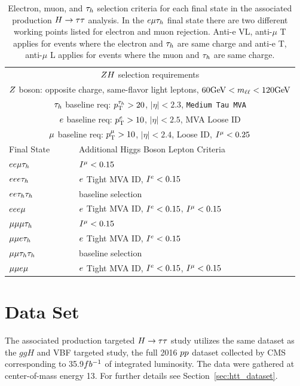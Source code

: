 \begin{table}[htbp]
\begin{small}
\begin{tabular}{ll}
\\
     \multicolumn{2}{c}{$ZH$ selection requirements}                 \\ 
     \multicolumn{2}{c}{$Z$ boson: opposite charge, same-flavor light leptons, $60\mathrm{GeV} < m_{\ell\ell} < 120\mathrm{GeV}$}  \\ 
     \multicolumn{2}{c}{$\tau_{h}$ baseline req: $p_\mathrm{T}^{\tau_{h}}>20$, $|\eta|<2.3$, \texttt{Medium Tau MVA}}   \\ 
     \multicolumn{2}{c}{$e$ baseline req: $p_\mathrm{T}^{e}>10$, $|\eta|<2.5$, MVA Loose ID }   \\ 
     \multicolumn{2}{c}{$\mu$ baseline req: $p_\mathrm{T}^{\mu}>10$, $|\eta|<2.4$, Loose ID, $I^{\mu}<0.25$ }   \\ 
\hline
  Final State           &        Additional Higgs Boson Lepton Criteria  \\
\hline
  $ee\mu\tau_{h}$     &   $I^{\mu}<0.15$       \\
  $eee\tau_{h}$      &   $e$ Tight MVA ID, $I^{e}<0.15$ \\
  $ee\tau_{h}\tau_{h}$    &   baseline selection       \\
  $eee\mu$       &   $e$ Tight MVA ID, $I^{e}<0.15$, $I^{\mu}<0.15$ \\
\hline
  $\mu\mu\mu\tau_{h}$   &   $I^{\mu}<0.15$       \\
  $\mu\mu e\tau_{h}$    &   $e$ Tight MVA ID, $I^{e}<0.15$ \\
  $\mu\mu\tau_{h}\tau_{h}$  &   baseline selection       \\
  $\mu\mu e\mu$     &   $e$ Tight MVA ID, $I^{e}<0.15$, $I^{\mu}<0.15$ \\
\hline
\end{tabular}
\end{small}
\caption{
Electron, muon, and $\tau_{h}$ selection criteria for each final state in the
associated production $H\to\tau\tau$ analysis. In the $e\mu\tau_{h}$ final state there
are two different working points listed for electron and muon rejection.
Anti-e VL, anti-$\mu$ T applies for events where the electron and $\tau_{h}$
are same charge and anti-e T, anti-$\mu$ L applies for events where the muon
and $\tau_{h}$ are same charge.
}
\label{tab:vh_inclusive_selection}
\end{table}



\section{Data Set}
\label{sec:vh_dataset}
The associated production targeted $H\to\tau\tau$ study utilizes the same dataset as the
$ggH$ and VBF targeted study, the full 2016 $pp$ 
dataset collected by CMS corresponding to 35.9$fb^{-1}$ 
of integrated luminosity. The data were gathered at center-of-mass energy 13\TeV.
For further details see Section~\ref{sec:htt_dataset}.



